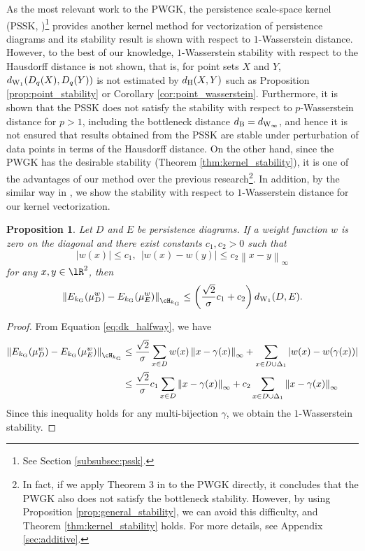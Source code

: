 \documentclass{article}
\newtheorem{prop}[thm]{Proposition}
\newcommand{\DD}{{\Delta}}
\providecommand{\abs}[1]{\left\lvert#1\right\rvert}
\providecommand{\norm}[1]{\left\lVert#1\right\rVert}
\providecommand{\pare}[1]{\left( #1 \right)}
\providecommand{\dk}[4]{\norm{E_{#1}(\mu^{#2}_{#3}) - E_{#1}(\mu^{#2}_{#4})}_{\cH_{#1}}}
\begin{document}
As the most relevant work to the PWGK, the persistence scale-space kernel (PSSK, \cite{RHBK15})\footnote{See Section \ref{subsubsec:pssk}.} provides another kernel method for vectorization of persistence diagrams and its stability result is shown with respect to $1$-Wasserstein distance.
However, to the best of our knowledge, $1$-Wasserstein stability with respect to the Hausdorff distance is not shown, that is, for point sets $X$ and $Y$, $d_{ {\rm W}_{1}}(D_{q}(X),D_{q}(Y))$ is not estimated by $d_{{\rm H}}(X,Y)$ such as Proposition \ref{prop:point_stability} or Corollary \ref{cor:point_wasserstein}.
Furthermore, it is shown \cite{RHBK15} that the PSSK does not satisfy the stability with respect to $p$-Wasserstein distance for $p>1$, including the bottleneck distance $d_{{\rm B}} = d_{{\rm W}_{\infty}}$, and hence it is not ensured that results obtained from the PSSK are stable under perturbation of data points in terms of the Hausdorff distance.
On the other hand, since the PWGK has the desirable stability (Theorem \ref{thm:kernel_stability}), it is one of the advantages of our method over the previous research\footnote{In fact, if we apply Theorem 3 in \cite{RHBK15} to the PWGK directly, it concludes that the PWGK also does not satisfy the bottleneck stability. However, by using Proposition \ref{prop:general_stability}, we can avoid this difficulty, and Theorem  \ref{thm:kernel_stability} holds. For more details, see Appendix \ref{sec:additive}.}.
In addition, by the similar way in \cite{RHBK15}, we show the stability with respect to $1$-Wasserstein distance for our kernel vectorization. 

\begin{prop}
\label{prop:pwgk_wasserstein}
Let $D$ and $E$ be persistence diagrams.
If a weight function $w$ is zero on the diagonal and there exist constants $c_{1},c_{2}>0$ such that 
\[
\abs{w(x)} \leq c_{1}, ~~ \abs{w(x)-w(y)} \leq c_{2} \norm{x-y}_{\infty}
\]
for any $x,y \in \lR^{2}$, then
\[
\dk{k_{{\rm G}}}{w}{D}{E} \leq \pare{ \frac{\sqrt{2}}{\sigma} c_{1}+c_{2}} d_{ {\rm W}_{1}}(D,E).
\]
\end{prop}

\begin{proof}
From Equation \eqref{eq:dk_halfway}, we have
\begin{align}
\dk{k_{{\rm G}}}{w}{D}{E} 
& \leq \frac{\sqrt{2}}{\sigma}\sum_{x \in D} w(x) \norm{x-\gamma(x)}_{\infty}+ \sum_{x \in D \cup \DD_{1}} \abs{w(x)-w(\gamma(x))} \label{eq:pwgk_inequality} \\
&\leq \frac{\sqrt{2}}{\sigma} c_{1} \sum_{x \in D} \norm{x-\gamma(x)}_{\infty} + c_{2} \sum_{x \in D \cup \DD_{1}} \norm{x-\gamma(x)}_{\infty} \nonumber 
\end{align}
Since this inequality holds for any multi-bijection $\gamma$,  we obtain the $1$-Wasserstein stability.
\end{proof}
\end{document}
